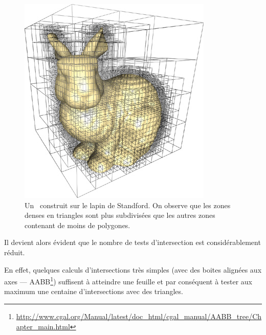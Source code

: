\begin{figure}[h]
  \begin{center}
   \includegraphics[width=.5\textwidth, keepaspectratio=true]{img/octree}
   \caption{Un \ construit sur le lapin de
   Standford\label{fig:octree}. On observe que les zones denses en triangles
   sont plus subdivisées que les autres zones contenant de moins de
   polygones.}
  \end{center}
\end{figure}

Il devient alors évident que le nombre de tests d'intersection est
considérablement réduit.

En effet, quelques calculs d'intersections très simples (avec des boites
alignées aux axes ---
AABB\footnote{\url{http://www.cgal.org/Manual/latest/doc_html/cgal_manual/AABB_tree/Chapter_main.html}})
suffisent à atteindre une feuille et par conséquent à tester aux maximum une
centaine d'intersections avec des triangles.

